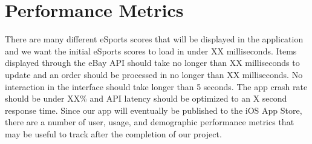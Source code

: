 \documentclass[onecolumn, draftclsnofoot,10pt, compsoc]{IEEEtran}
\begin{document}
\section{Performance Metrics}
There are many different eSports scores that will be displayed in the application and we want the initial eSports scores to load in under XX milliseconds.
Items displayed through the eBay API should take no longer than XX milliseconds to update and an order should be processed in no longer than XX milliseconds. 
No interaction in the interface should take longer than 5 seconds. The app crash rate should be under XX\% and API latency should be optimized to an X second response time. 
Since our app will eventually be published to the iOS App Store, there are a number of user, usage, and demographic performance metrics that may be useful to track after the completion of our project. 
\end{document}

